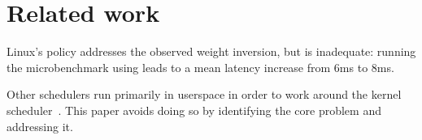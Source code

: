 \section{Related work}

Linux's \schedidle{} policy addresses the observed weight inversion, but is
inadequate: running the microbenchmark using \schedidle{} leads to a mean
latency increase from 6ms to 8ms.

Other schedulers run primarily in userspace in order to work around the kernel
scheduler~\cite{perfiso,caladan,skyloft}. This paper avoids doing so by
identifying the core problem and addressing it.